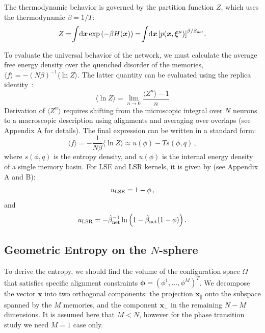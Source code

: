 \documentclass{article}
\newcommand{\dd}{{\mathrm{d}}}
\theoremstyle{plain}
\theoremstyle{definition}
\theoremstyle{remark}
\begin{document}
The thermodynamic behavior is governed by the partition function $Z$, which uses the thermodynamic $\beta = 1/T$:
\begin{equation}
    Z = \!\int\!\dd \bm{x} \exp\left( -\beta H(\bm{x}) \right) = \!\int\! \dd \bm{x} \left[ p(\bm{x}, \bm{\xi}^\mu) \right]^{\beta/\beta_{\rm net}}\!.
    \label{eq:partition}
\end{equation}

To evaluate the universal behavior of the network, we must calculate the average free energy density over the quenched disorder of the memories, $\langle f \rangle = -(N\beta)^{-1} \langle \ln Z \rangle$. The latter quantity can be evaluated using the replica identity~\cite{sk75}:
\begin{equation}
    \langle \ln Z \rangle = \lim_{n \to 0} \frac{\langle Z^n \rangle - 1}{n}
    \label{eq:limit}
\end{equation}
Derivation of $\langle Z^n \rangle$ requires shifting from the microscopic integral over $N$ neurons to a macroscopic description using alignments and averaging over overlaps (see Appendix A for details). The final expression can be written in a standard form:
\begin{equation}
    \langle f \rangle = -\frac{1}{N\beta} \langle \ln Z \rangle 
    \approx  u(\phi) - T s(\phi, q)\,,
\end{equation}
where  $s(\phi, q)$ is the entropy density, and $u(\phi)$ is the internal energy density of a single memory basin. For LSE and LSR kernels, it is given by (see Appendix A and B):
\begin{equation}
    u_{\rm LSE} = 1-\phi\,,
\end{equation}
and 
\begin{equation}
    u_{\rm LSR} = -\hat\beta^{-1}_{\rm net} \ln \Big(1 - \hat\beta_{\rm net} (1-\phi) \Big)\,.
\end{equation}

\subsection{Geometric Entropy on the $N$-sphere}

To derive the entropy, we should find the volume of the configuration space $\Omega$ that satisfies specific alignment constraints $\bm{\phi} = (\phi^1, \dots, \phi^M)^T$. We decompose the vector $\bm{x}$ into two orthogonal components: the projection $\bm{x}_{\parallel}$ onto the subspace spanned by the $M$ memories, and the component $\bm{x}_{\perp}$ in the remaining $N-M$ dimensions. It is assumed here that $M<N$, however for the phase transition study we need $M=1$ case only.
\end{document}
